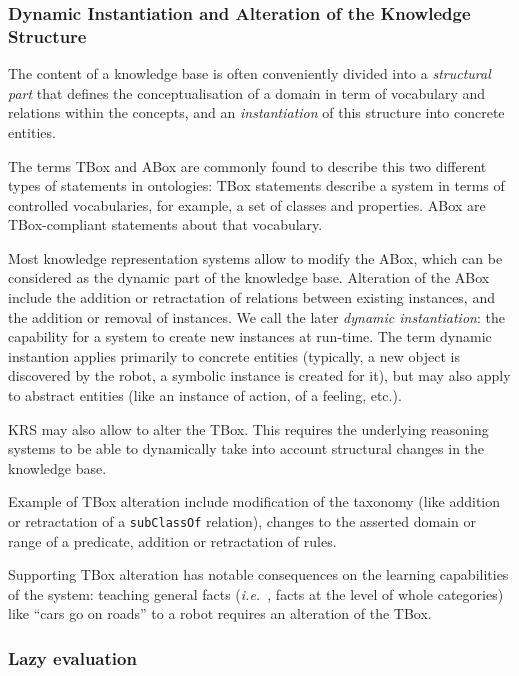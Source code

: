 \documentclass[a4paper, twocolumn]{article}
\newcommand{\ie}{{\textit{i.e.\ }}}
\newcommand{\concept}[1]{{\footnotesize \texttt{#1}}}
\begin{document}
\subsubsection{Dynamic Instantiation and Alteration of the Knowledge Structure}

The content of a knowledge base is often conveniently divided into a
\emph{structural part} that defines the conceptualisation of a domain in term
of vocabulary and relations within the concepts, and an \emph{instantiation} of
this structure into concrete entities.

The terms TBox and ABox are commonly found to describe this two different types of
statements in ontologies: TBox statements describe a system in terms of
controlled vocabularies, for example, a set of classes and properties. ABox are
TBox-compliant statements about that vocabulary.

Most knowledge representation systems allow to modify the ABox, which can be
considered as the dynamic part of the knowledge base. Alteration of the ABox
include the addition or retractation of relations between existing instances,
and the addition or removal of instances. We call the later \emph{dynamic
instantiation}: the capability for a system to create new instances at
run-time. The term dynamic instantion applies primarily to concrete entities
(typically, a new object is discovered by the robot, a symbolic instance is
created for it), but may also apply to abstract entities (like an instance of
action, of a feeling, etc.).

KRS may also allow to alter the TBox. This requires the underlying reasoning
systems to be able to dynamically take into account structural changes in the
knowledge base.

Example of TBox alteration include modification of the taxonomy (like addition
or retractation of a \concept{subClassOf} relation), changes to the asserted
domain or range of a predicate, addition or retractation of rules.

Supporting TBox alteration has notable consequences on the learning
capabilities of the system: teaching general facts (\ie, facts at the level of
whole categories) like ``cars go on roads'' to a robot requires an alteration
of the TBox.

\subsubsection{Lazy evaluation}
\label{sect|lazy-evaluation}
\end{document}
